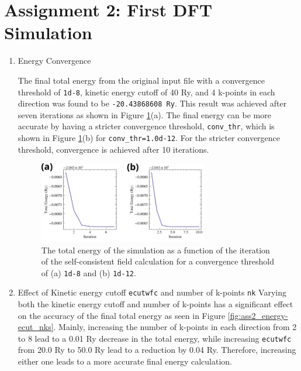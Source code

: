 \documentclass[10pt,a4paper]{labreport}
\begin{document}
\newpage
\section{Assignment 2: First DFT Simulation}
\begin{enumerate}
  \item Energy Convergence
  
  The final total energy from the original input file with a convergence threshold of \texttt{1d-8}, kinetic energy cutoff of 40 Ry, and 4 k-points in each direction was found to be \texttt{-20.43868608 Ry}.
  This result was achieved after seven iterations as shown in Figure \ref{fig:ass2_conv-thr}(a). The final energy can be more accurate by having a stricter convergence threshold, \texttt{conv\_thr}, which is shown in Figure  \ref{fig:ass2_conv-thr}(b) for \texttt{conv\_thr=1.0d-12}. For the stricter convergence threshold, convergence is achieved after 10 iterations. 

  \begin{figure}[h]
    \centering 
    \includegraphics[width = 0.7\textwidth]{figs/ass2_conv-thr.png}
    \caption{The total energy of the simulation as a function of the iteration of the self-consistent field calculation for a convergence threshold of (a) \texttt{1d-8} and (b) \texttt{1d-12}. }
    \label{fig:ass2_conv-thr}
  \end{figure}

  \item Effect of Kinetic energy cutoff \texttt{ecutwfc} and number of k-points \texttt{nk}
  Varying both the kinetic energy cutoff and number of k-points has a significant effect on the accuracy of the final total energy as seen in Figure \ref{fig:ass2_energy-ecut_nks}. 
  Mainly, increasing the number of k-points in each direction from 2 to 8 lead to a 0.01 Ry decrease in the total energy, while increasing \texttt{ecutwfc} from 20.0 Ry to 50.0 Ry lead to a reduction by 0.04 Ry. Therefore, increasing either one leads to a more accurate final energy calculation.   
  

\end{enumerate}
\end{document}
